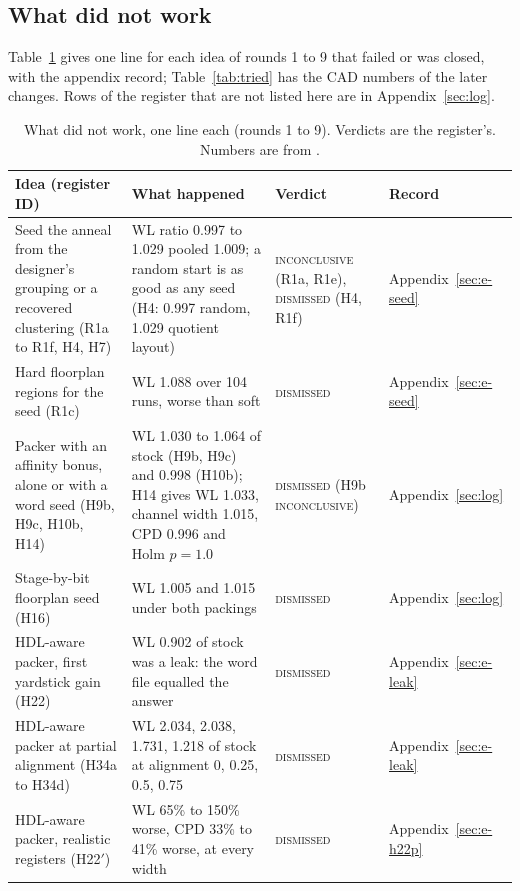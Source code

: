 \subsection{What did not work}
\label{sec:r-notwork}

Table~\ref{tab:notwork} gives one line for each idea of rounds 1 to 9 that failed or was closed, with the appendix record; Table~\ref{tab:tried} has the CAD numbers of the later changes. Rows of the register that are not listed here are in Appendix~\ref{sec:log}.

\begin{table}[t]
\centering
\caption{What did not work, one line each (rounds 1 to 9). Verdicts are the register's. Numbers are from .}
\label{tab:notwork}
\footnotesize
\setlength{\tabcolsep}{3pt}
\begin{tabular}{@{}p{4.1cm}p{7.3cm}p{2.2cm}p{3.0cm}@{}}
\toprule
Idea (register ID) & What happened & Verdict & Record \\
\midrule
Seed the anneal from the designer's grouping or a recovered clustering (R1a to R1f, H4, H7) & WL ratio 0.997 to 1.029 pooled 1.009; a random start is as good as any seed (H4: 0.997 random, 1.029 quotient layout) & \textsc{inconclusive} (R1a, R1e), \textsc{dismissed} (H4, R1f) & Appendix~\ref{sec:e-seed} \\
Hard floorplan regions for the seed (R1c) & WL 1.088 over 104 runs, worse than soft & \textsc{dismissed} & Appendix~\ref{sec:e-seed} \\
Packer with an affinity bonus, alone or with a word seed (H9b, H9c, H10b, H14) & WL 1.030 to 1.064 of stock (H9b, H9c) and 0.998 (H10b); H14 gives WL 1.033, channel width 1.015, CPD 0.996 and Holm $p=1.0$ & \textsc{dismissed} (H9b \textsc{inconclusive}) & Appendix~\ref{sec:log} \\
Stage-by-bit floorplan seed (H16) & WL 1.005 and 1.015 under both packings & \textsc{dismissed} & Appendix~\ref{sec:log} \\
HDL-aware packer, first yardstick gain (H22) & WL 0.902 of stock was a leak: the word file equalled the answer & \textsc{dismissed} & Appendix~\ref{sec:e-leak} \\
HDL-aware packer at partial alignment (H34a to H34d) & WL 2.034, 2.038, 1.731, 1.218 of stock at alignment 0, 0.25, 0.5, 0.75 & \textsc{dismissed} & Appendix~\ref{sec:e-leak} \\
HDL-aware packer, realistic registers (H22$'$) & WL 65\% to 150\% worse, CPD 33\% to 41\% worse, at every width & \textsc{dismissed} & Appendix~\ref{sec:e-h22p} \\

\end{tabular}
\end{table}
